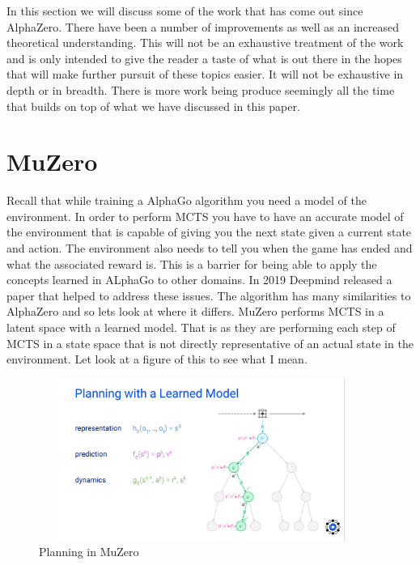 
In this section we will discuss some of the work that has come out since AlphaZero. There have been a number of improvements as well as an increased theoretical understanding. This will not be an exhaustive treatment of the work and is only intended to give the reader a taste of what is out there in the hopes that will make further pursuit of these topics easier. It will not be exhaustive in depth or in breadth. There is more work being produce seemingly all the time that builds on top of what we have discussed in this paper. 

\section{MuZero}

Recall that while training a AlphaGo algorithm you need a model of the environment. In order to perform MCTS you have to have an accurate model of the environment that is capable of giving you the next state given a current state and action. The environment also needs to tell you when the game has ended and what the associated reward is. This is a barrier for being able to apply the concepts learned in ALphaGo to other domains. In 2019 Deepmind released a paper \cite{muzero} that helped to address these issues. The algorithm has many similarities to AlphaZero and so lets look at where it differs. MuZero performs MCTS in a latent space with a learned model. That is as they are performing each step of MCTS in a state space that is not directly representative of an actual state in the environment. Let look at a figure of this to see what I mean. 

\begin{figure}[H]
       \centering
       \includegraphics[width=400px,height=200px]{images/muzero_learned_model.png}
       \caption{Planning in MuZero}
       \label{fig:my_label}
\end{figure}

